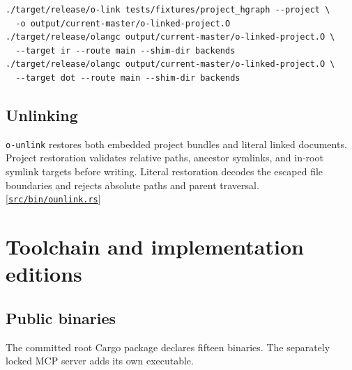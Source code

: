 \documentclass[11pt,oneside]{article}
\newcommand{\src}[1]{\textcolor{OSlate}{\scriptsize[\href{https://github.com/lostadi/OSTADIX/blob/c0b02c326b2329a95ba52447c7180bc93957cd57/#1}{\nolinkurl{#1}}]}\allowbreak}
\begin{document}
\begin{lstlisting}[style=plaincode]
./target/release/o-link tests/fixtures/project_hgraph --project \
  -o output/current-master/o-linked-project.O
./target/release/olangc output/current-master/o-linked-project.O \
  --target ir --route main --shim-dir backends
./target/release/olangc output/current-master/o-linked-project.O \
  --target dot --route main --shim-dir backends
\end{lstlisting}

\subsection{Unlinking}

\texttt{o-unlink} restores both embedded project bundles and literal linked
documents. Project restoration validates relative paths, ancestor symlinks,
and in-root symlink targets before writing. Literal restoration decodes the
escaped file boundaries and rejects absolute paths and parent traversal.
\src{src/bin/ounlink.rs}

\section{Toolchain and implementation editions}
\label{sec:toolchain}

\subsection{Public binaries}

The committed root Cargo package declares fifteen binaries. The separately
locked MCP server adds its own executable.
\end{document}
